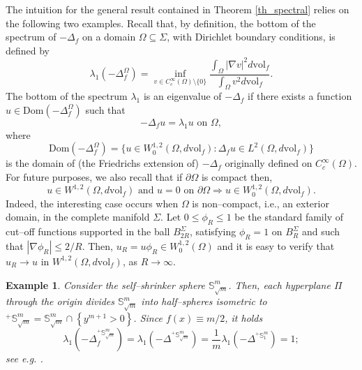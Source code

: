 \documentclass[11pt,leqno]{amsart}\usepackage{amsmath}
\newtheorem{example}[theorem]{Example}
\numberwithin{equation}{section}
\begin{document}
The intuition for the general result contained in Theorem \ref{th_spectral} relies on the following two examples.
Recall that, by definition, the bottom of the spectrum of $-\Delta_f$ on a domain $\Omega \subseteq \Sigma$, with
Dirichlet boundary conditions, is defined by
\[
\lambda_{1}(  -\Delta_{f}^\Omega)=\inf_{v\in C^{\infty}_{c}(\Omega)\setminus\{0\}}\frac{\int_{\Omega}{|\nabla v|^2 d\mathrm{vol}_f}}{\int_{\Omega}v^2 d\mathrm{vol}_f}.
\]
The bottom of the spectrum $\lambda_1$ is an eigenvalue of $-\Delta_f$ if there exists a function $u\in \mathrm{Dom}(-\Delta_{f}^{\Omega})$ such that
\[
-\Delta_f u = \lambda_1 u \text{ on }\Omega,
\]
where
\[
\mathrm{Dom}(-\Delta_{f}^{\Omega})=\{u \in W^{1,2}_0(\Omega,d\mathrm{vol}_f):\Delta_f u \in L^2(\Omega,d\mathrm{vol}_f)\}
\]
is the domain of (the Friedrichs extension of) $-\Delta_{f}$ originally defined on $C^{\infty}_{c}(\Omega)$. For future purposes,
we also recall that if $\partial \Omega$ is compact then,
\[
u\in W^{1,2}(\Omega,d\mathrm{vol}_f) \text{ and }u=0 \text{ on }\partial{\Omega} \Rightarrow { } u \in W^{1,2}_0(\Omega,d\mathrm{vol}_f).
\]
Indeed, the interesting case occurs when $\Omega$ is non--compact, i.e., an exterior domain, in the complete manifold $\Sigma$. Let $0\leq \phi_R \leq 1$ be the standard family of cut--off functions supported in the ball $B^{\Sigma}_{2R}$, satisfying $\phi_{R}=1$ on $B^{\Sigma}_R$ and such that $|\nabla \phi_{R}|\leq 2/R$. Then, $u_R=u\phi_R \in W^{1,2}_{0}(\Omega)$ and it is easy to verify that
$u_{R} \to u$ in $W^{1,2}(\Omega,d\mathrm{vol}_f)$, as $R \to \infty$.
\begin{example}
\rm{Consider the self--shrinker sphere $\mathbb{S}_{\sqrt{m}}^{m}$. Then, each hyperplane
$\Pi$ through the origin divides $\mathbb{S}_{\sqrt{m}}^{m}$ into half--spheres
isometric to $^{+}\mathbb{S}_{\sqrt{m}}^{m}=\mathbb{S}_{\sqrt{m}}^{m}\cap\left\{  y^{m+1}>0\right\}
$. Since $f\left(  x\right)  \equiv m/2$, it holds\[
\lambda_{1}(  -\Delta_{f}^{^{+}\mathbb{S}_{\sqrt{m}}^{m}})  =\lambda_{1}(
-\Delta^{^{+}\mathbb{S}_{\sqrt{m}}^{m}})  =\frac{1}{m}\lambda_{1}(
-\Delta^{^{+}\mathbb{S}_{1}^{m}})  =1;
\]
see e.g. \cite{Ch_Eigenvalues}.}
\end{example}
\end{document}
